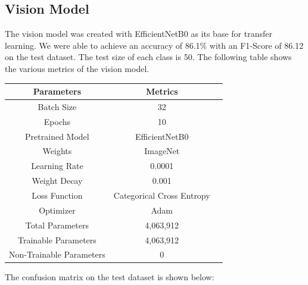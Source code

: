 \documentclass[fleqn, 10pt, twoside]{IOEGC}
\begin{document}
\subsection{Vision Model}
The vision model was created with EfficientNetB0 as its base for transfer learning. We were able to achieve an accuracy of 86.1\% with an F1-Score of 86.12 on the test dataset. The test size of each class is 50. The following table shows the various metrics of the vision model.
\begin{center}
	\begin{tabular}{ |c|c|c| }
		\hline
		\textbf{Parameters}      & \textbf{Metrics}          \\
		\hline
		Batch Size               & 32                        \\
		\hline
		Epochs                   & 10                        \\
		\hline
		Pretrained Model         & EfficientNetB0            \\
		\hline
		Weights                  & ImageNet                  \\
		\hline
		Learning Rate            & 0.0001                    \\
		\hline
		Weight Decay             & 0.001                     \\
		\hline
		Loss Function            & Categorical Cross Entropy \\
		\hline
		Optimizer                & Adam                      \\
		\hline
		Total Parameters         & 4,063,912                 \\
		\hline
		Trainable Parameters     & 4,063,912                 \\
		\hline
		Non-Trainable Parameters & 0                         \\
		\hline
	\end{tabular}
\end{center}
\clearpage
The confusion matrix on the test dataset is shown below:
\end{document}
